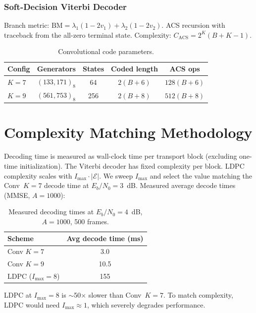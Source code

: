 \documentclass[12pt, a4paper]{article}
\begin{document}
\subsubsection{Soft-Decision Viterbi Decoder}
Branch metric: $\text{BM} = \lambda_1(1-2v_1)+\lambda_2(1-2v_2)$. ACS recursion with traceback from the all-zero terminal state. Complexity: $C_{\text{ACS}} = 2^K(B+K-1)$.

\begin{table}[ht]
\centering
\caption{Convolutional code parameters.}
\begin{tabular}{lcccc}
\toprule
Config & Generators & States & Coded length & ACS ops \\
\midrule
$K\!=\!7$ & $(133,171)_8$ & 64 & $2(B+6)$ & $128(B+6)$ \\
$K\!=\!9$ & $(561,753)_8$ & 256 & $2(B+8)$ & $512(B+8)$ \\
\bottomrule
\end{tabular}
\end{table}

\section{Complexity Matching Methodology}
Decoding time is measured as wall-clock time per transport block (excluding one-time initialization). The Viterbi decoder has fixed complexity per block. LDPC complexity scales with $I_{\max}\cdot|\mathcal{E}|$. We sweep $I_{\max}$ and select the value matching the Conv~$K\!=\!7$ decode time at $E_b/N_0=3$~dB. Measured average decode times (MMSE, $A\!=\!1000$):

\begin{table}[H]
\centering
\caption{Measured decoding times at $E_b/N_0=4$~dB, $A=1000$, 500 frames.}
\begin{tabular}{lc}
\toprule
Scheme & Avg decode time (ms) \\
\midrule
Conv $K\!=\!7$ & 3.0 \\
Conv $K\!=\!9$ & 10.5 \\
LDPC ($I_{\max}\!=\!8$) & 155 \\
\bottomrule
\end{tabular}
\end{table}

LDPC at $I_{\max}\!=\!8$ is $\sim$50$\times$ slower than Conv~$K\!=\!7$. To match complexity, LDPC would need $I_{\max}\!\approx\!1$, which severely degrades performance.
\end{document}
